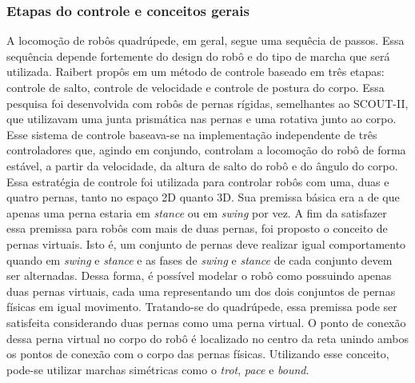 \documentclass[../main.tex]{subfiles}
\begin{document}
  \subsubsection{Etapas do controle e conceitos gerais}
  A locomoção de robôs quadrúpede, em geral, segue uma sequêcia de passos. Essa sequência depende fortemente do design do robô e do tipo de marcha que será utilizada. Raibert propôs em \cite{Raibert1986} um método de controle baseado em três etapas: controle de salto, controle de velocidade e controle de postura do corpo. Essa pesquisa foi desenvolvida com robôs de pernas rígidas, semelhantes ao SCOUT-II, que utilizavam uma junta prismática nas pernas e uma rotativa junto ao corpo. Esse sistema de controle baseava-se na implementação independente de três controladores que, agindo em conjundo, controlam a locomoção do robô de forma estável, a partir da velocidade, da altura de salto do robô e do ângulo do corpo. Essa estratégia de controle foi utilizada para controlar robôs com uma, duas e quatro pernas, tanto no espaço 2D quanto 3D. Sua premissa básica era a de que apenas uma perna estaria em \textit{\textit{stance}} ou em \textit{\textit{swing}} por vez. A fim da satisfazer essa premissa para robôs com mais de duas pernas, foi proposto o conceito de pernas virtuais. Isto é, um conjunto de pernas deve realizar igual comportamento quando em \textit{\textit{swing}} e \textit{\textit{stance}} e as fases de \textit{swing} e \textit{stance} de cada conjunto devem ser alternadas. Dessa forma, é possível modelar o robô como possuindo apenas duas pernas virtuais, cada uma representando um dos dois conjuntos de pernas físicas em igual movimento. Tratando-se do quadrúpede, essa premissa pode ser satisfeita considerando duas pernas como uma perna virtual. O ponto de conexão dessa perna virtual no corpo do robô é localizado no centro da reta unindo ambos os pontos de conexão com o corpo das pernas físicas. Utilizando esse conceito, pode-se utilizar marchas simétricas como o \textit{trot}, \textit{pace} e \textit{bound}.
\end{document}
